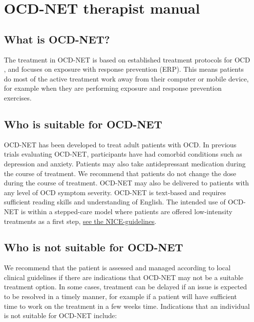 \documentclass[]{book}
\theoremstyle{definition}
\theoremstyle{definition}
\theoremstyle{definition}
\theoremstyle{remark}
\begin{document}
\hypertarget{ocd-net-therapist-manual}{%
\chapter{OCD-NET therapist manual}\label{ocd-net-therapist-manual}}

\hypertarget{what-is-ocd-net}{%
\section{What is OCD-NET?}\label{what-is-ocd-net}}

The treatment in OCD-NET is based on established treatment protocols for
OCD \citep{foa2012}, and focuses on exposure with response prevention
(ERP). This means patients do most of the active treatment work away
from their computer or mobile device, for example when they are
performing exposure and response prevention exercises.

\hypertarget{who-is-suitable-for-ocd-net}{%
\section{Who is suitable for
OCD-NET}\label{who-is-suitable-for-ocd-net}}

OCD-NET has been developed to treat adult patients with OCD. In previous
trials evaluating OCD-NET, participants have had comorbid conditions
such as depression and anxiety. Patients may also take antidepressant
medication during the course of treatment. We recommend that patients do
not change the dose during the course of treatment. OCD-NET may also be
delivered to patients with any level of OCD symptom severity. OCD-NET is
text-based and requires sufficient reading skills and understanding of
English. The intended use of OCD-NET is within a stepped-care model
where patients are offered low-intensity treatments as a first step,
\href{https://www.nice.org.uk/guidance/CG31/chapter/1-Guidance\#stepped-care-for-adults-young-people-and-children-with-ocd-or-bdd}{see
the NICE-guidelines}.

\hypertarget{who-is-not-suitable-for-ocd-net}{%
\section{Who is not suitable for
OCD-NET}\label{who-is-not-suitable-for-ocd-net}}

We recommend that the patient is assessed and managed according to local
clinical guidelines if there are indications that OCD-NET may not be a
suitable treatment option. In some cases, treatment can be delayed if an
issue is expected to be resolved in a timely manner, for example if a
patient will have sufficient time to work on the treatment in a few
weeks time. Indications that an individual is not suitable for OCD-NET
include:
\end{document}
